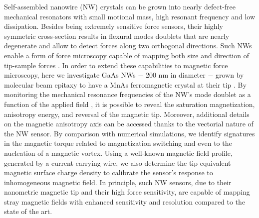 Self-assembled nanowire (NW) crystals can be grown into nearly defect-free mechanical resonators with small motional mass, high resonant frequency and low dissipation. Besides being extremely sensitive force sensors, their highly symmetric cross-section results in flexural modes doublets that are nearly degenerate and allow to detect forces along two orthogonal directions. Such NWs enable a form of force microscopy capable of mapping both size and direction of tip-sample forces \cite{Rossi_2016,de_L_pinay_2016}.
	In order to extend these capabilities to magnetic force microscopy, here we investigate GaAs NWs $-$ 200 nm in diameter $-$ grown by molecular beam epitaxy to have a MnAs ferromagnetic crystal at their tip \cite{Hubmann_2016}. By monitoring the mechanical resonance frequencies of the NW's mode doublet as a function of the applied field \cite{Gross_2016}, it is possible to reveal the saturation magnetization, anisotropy energy, and reversal of the magnetic tip. Moreover, additional details on the magnetic anisotropy axis can be accessed thanks to the vectorial nature of the NW sensor. By comparison with numerical simulations, we identify signatures in the magnetic torque related to magnetization switching and even to the nucleation of a magnetic vortex. Using a well-known magnetic field profile, generated by a current carrying wire, we also determine the tip-equivalent magnetic surface charge density to calibrate the sensor's response to inhomogeneous magnetic field.
	In principle, such NW sensors, due to their nanometric magnetic tip and their high force sensitivity, are capable of mapping stray magnetic fields with enhanced sensitivity and resolution compared to the state of the art.